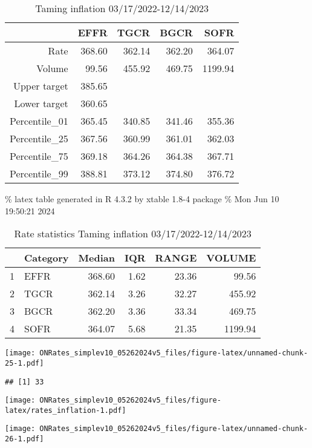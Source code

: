 \documentclass[
]{article}
\begin{document}
\begin{table}[ht]
\centering
\begin{tabular}{rrrrr}
  \hline
 & EFFR & TGCR & BGCR & SOFR \\ 
  \hline
Rate & 368.60 & 362.14 & 362.20 & 364.07 \\ 
  Volume & 99.56 & 455.92 & 469.75 & 1199.94 \\ 
  Upper target & 385.65 &  &  &  \\ 
  Lower target & 360.65 &  &  &  \\ 
  Percentile\_01 & 365.45 & 340.85 & 341.46 & 355.36 \\ 
  Percentile\_25 & 367.56 & 360.99 & 361.01 & 362.03 \\ 
  Percentile\_75 & 369.18 & 364.26 & 364.38 & 367.71 \\ 
  Percentile\_99 & 388.81 & 373.12 & 374.80 & 376.72 \\ 
   \hline
\end{tabular}
\caption{Taming inflation 03/17/2022-12/14/2023} 
\end{table}

\% latex table generated in R 4.3.2 by xtable 1.8-4 package
\% Mon Jun 10 19:50:21 2024

\begin{table}[ht]
\centering
\begin{tabular}{rlrrrr}
  \hline
 & Category & Median & IQR & RANGE & VOLUME \\ 
  \hline
1 & EFFR & 368.60 & 1.62 & 23.36 & 99.56 \\ 
  2 & TGCR & 362.14 & 3.26 & 32.27 & 455.92 \\ 
  3 & BGCR & 362.20 & 3.36 & 33.34 & 469.75 \\ 
  4 & SOFR & 364.07 & 5.68 & 21.35 & 1199.94 \\ 
   \hline
\end{tabular}
\caption{Rate statistics Taming inflation 03/17/2022-12/14/2023} 
\end{table}

\texttt{[image: ONRates\_simplev10\_05262024v5\_files/figure-latex/unnamed-chunk-25-1.pdf]}

\begin{verbatim}
## [1] 33
\end{verbatim}

\texttt{[image: ONRates\_simplev10\_05262024v5\_files/figure-latex/rates\_inflation-1.pdf]}

\texttt{[image: ONRates\_simplev10\_05262024v5\_files/figure-latex/unnamed-chunk-26-1.pdf]}
\end{document}
